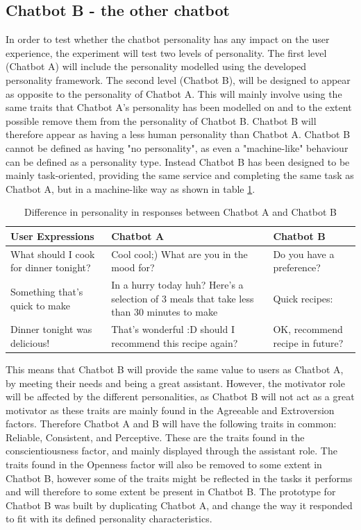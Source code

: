 \vspace{5mm}

    \subsection{Chatbot B - the other chatbot}
    In order to test whether the chatbot personality has any impact on the user experience, the experiment will test two levels of personality. The first level (Chatbot A) will include the personality modelled using the developed personality framework. The second level (Chatbot B), will be designed to appear as opposite to the personality of Chatbot A. This will mainly involve using the same traits that Chatbot A's personality has been modelled on and to the extent possible remove them from the personality of Chatbot B. Chatbot B will therefore appear as having a less human personality than Chatbot A. Chatbot B cannot be defined as having "no personality", as even a "machine-like" behaviour can be defined as a personality type. Instead Chatbot B has been designed to be mainly task-oriented, providing the same service and completing the same task as Chatbot A, but in a machine-like way as shown in table \ref{table:3}.
    
    \begin{table}[h]
    \begin{tabular}{ |p{3cm}||p{5cm}||p{5cm}| }
     \hline
        User Expressions & Chatbot A & Chatbot B \\
     \hline
        What should I cook for dinner tonight? &    Cool cool;) What are you in the mood for?   & Do you have a preference? \\
     \hline   
        Something that's quick to make &   In a hurry today huh? Here's a selection of 3 meals that take less than 30 minutes to make  & Quick recipes: \\
     \hline
        Dinner tonight was delicious! & That's wonderful :D should I recommend this recipe again?  & OK, recommend recipe in future? \\
     \hline
    \end{tabular}
    \caption{Difference in personality in responses between Chatbot A and Chatbot B}
    \label{table:3}
    \end{table}
    
    This means that Chatbot B will provide the same value to users as Chatbot A, by meeting their needs and being a great assistant. However, the motivator role will be affected by the different personalities, as Chatbot B will not act as a great motivator as these traits are mainly found in the Agreeable and Extroversion factors. Therefore Chatbot A and B will have the following traits in common: Reliable, Consistent, and Perceptive. These are the traits found in the conscientiousness factor, and mainly displayed through the assistant role. The traits found in the Openness factor will also be removed to some extent in Chatbot B, however some of the traits might be reflected in the tasks it performs and will therefore to some extent be present in Chatbot B. The prototype for Chatbot B was built by duplicating Chatbot A, and change the way it responded to fit with its defined personality characteristics.

